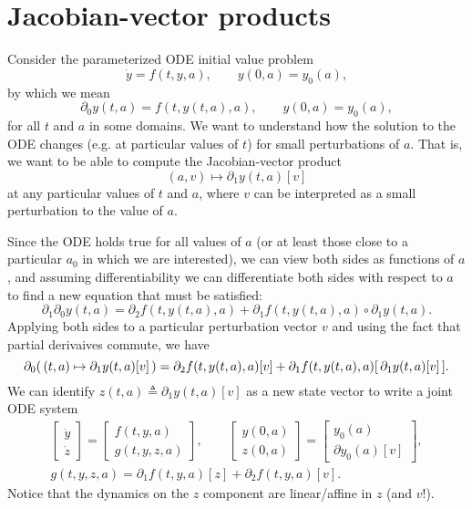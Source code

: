 \documentclass{article}
\begin{document}
\section{Jacobian-vector products}
Consider the parameterized ODE initial value problem
\begin{equation}
    \dot y = f(t, y, a), \qquad y(0, a) = y_0(a),
\end{equation}
by which we mean
\begin{equation}
    \partial_0 y(t, a) = f(t, y(t, a), a), \qquad y(0, a) = y_0(a),
\end{equation}
for all $t$ and $a$ in some domains.
We want to understand how the solution to the ODE changes (e.g. at particular
values of $t$) for small perturbations of $a$. That is, we want to be able to
compute the Jacobian-vector product
\begin{equation}
    (a, v) \mapsto \partial_1 y(t, a)[v]
\end{equation}
at any particular values of $t$ and $a$, where $v$ can be interpreted as a
small perturbation to the value of $a$.

Since the ODE holds true for all values of $a$ (or at least those close to a
particular $a_0$ in which we are interested), we can view both sides as
functions of $a$, and assuming differentiability we can differentiate both
sides with respect to $a$ to find a new equation that must be satisfied:
\begin{equation}
    \partial_1 \partial_0 y(t, a) = \partial_2 f(t, y(t, a), a) + \partial_1 f(t, y(t, a), a) \circ \partial_1 y(t, a).
\end{equation}
Applying both sides to a particular perturbation vector $v$ and using the fact
that partial derivaives commute, we have
\begin{equation}
    \partial_0 (\, (t, a) \mapsto \partial_1 y(t, a)[v] \,) = \partial_2 f(t, y(t, a), a)[v] + \partial_1 f(t, y(t, a), a) [ \, \partial_1 y(t, a)[v] \,].
    \notag
\end{equation}
We can identify $z(t, a) \triangleq \partial_1 y(t, a)[v]$ as a new state
vector to write a joint ODE system
\begin{gather}
    \begin{bmatrix}
        \dot y \\
        \dot z
    \end{bmatrix}
    =
    \begin{bmatrix}
        f(t, y, a) \\
        g(t, y, z, a)
    \end{bmatrix},
    \qquad
    \begin{bmatrix}
        y(0, a) \\
        z(0, a)
    \end{bmatrix}
    =
    \begin{bmatrix}
        y_0(a) \\
        \partial y_0(a)[v]
    \end{bmatrix},
    \\
    g(t, y, z, a) = \partial_1 f(t, y, a)[z] + \partial_2 f(t, y, a)[v].
\end{gather}
Notice that the dynamics on the $z$ component are linear/affine in $z$ (and $v$!).
\end{document}
